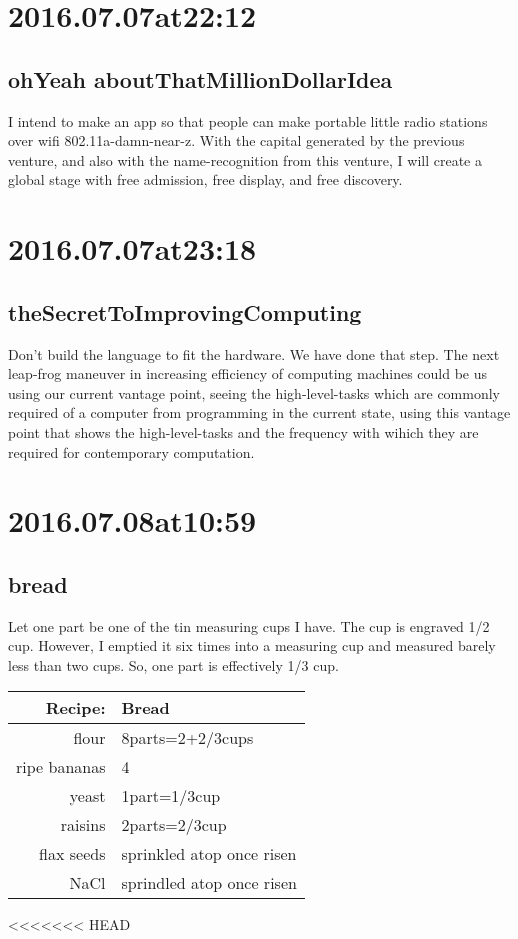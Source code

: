 \begin{enumerate}
\begin{enumerate}
\section*{ 2016.07.07at22:12 }
\subsection*{ ohYeah aboutThatMillionDollarIdea }
I intend to make an app so that people can make portable little radio stations over wifi 802.11a-damn-near-z. With the capital generated by the previous venture, and also with the name-recognition from this venture, I will create a global stage with free admission, free display, and free discovery.

\section*{ 2016.07.07at23:18 }
\subsection*{ theSecretToImprovingComputing }
Don't build the language to fit the hardware. We have done that step. The next leap-frog maneuver in increasing efficiency of computing machines could be us using our current vantage point, seeing the high-level-tasks which are commonly required of a computer from programming in the current state, using this vantage point that shows the high-level-tasks and the frequency with wihich they are required for contemporary computation.

\section*{ 2016.07.08at10:59 }
\subsection*{ bread }
Let one part be one of the tin measuring cups I have. The cup is engraved 1/2 cup. However, I emptied it six times into a measuring cup and measured barely less than two cups. So, one part is effectively 1/3 cup.
\begin{center}
\begin{tabular}{|r|l|}
\hline
Recipe:&Bread\\
\hline
flour           &   8parts=2+2/3cups\\
ripe bananas    &   4\\
yeast           &   1part=1/3cup\\
raisins         &   2parts=2/3cup\\
flax seeds      &   sprinkled atop once risen\\
NaCl            &   sprindled atop once risen\\
\hline
\end{tabular}
\end{center}
<<<<<<< HEAD


\end{enumerate}
\end{enumerate}
